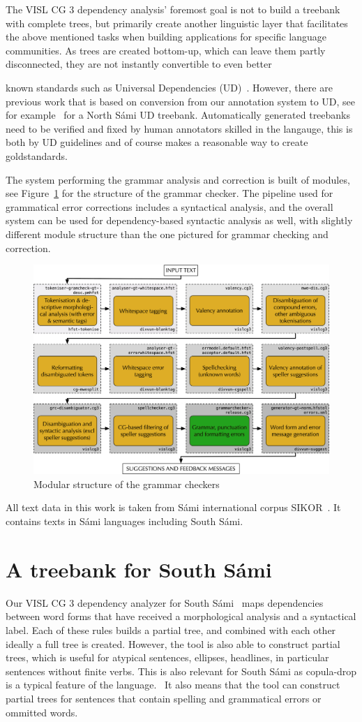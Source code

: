 \documentclass[free]{flammie}
\begin{document}
The VISL CG 3 dependency analysis' foremost goal is not to build a treebank with
complete trees, but primarily create another linguistic layer that facilitates
the above mentioned tasks when building applications for specific language
communities.  As trees are created bottom-up, which can leave them partly
disconnected, they are not instantly convertible to even better

known standards such as Universal Dependencies
(UD)~\cite{marneffe2021universal}.  However, there are previous work that is
based on conversion from our annotation system to UD, see for
example~\cite{sheyanova:2017,antonsen-etal-2010-reusing} for a North Sámi UD
treebank.  Automatically generated treebanks need to be verified and fixed by
human annotators skilled in the langauge, this is both by UD guidelines and of
course makes a reasonable way to create goldstandards.

The system performing the grammar analysis and correction is built of modules,
see Figure~\ref{fig:gramcheckflow} for the structure of the grammar checker.
The pipeline used for grammatical error corrections includes a syntactical
analysis, and the overall system can be used for dependency-based syntactic
analysis as well, with slightly different module structure than the one pictured
for grammar checking and correction.~\cite{wiechetek-kappfjell-2023-south}


\begin{figure}
    \centering
    \includegraphics[width=.4\textwidth ]{GramCheckFlow2.0.png}
    \caption{Modular structure of the grammar checkers\label{fig:gramcheckflow}}
\end{figure}

All text data in this work is taken from Sámi international corpus
SIKOR~\cite{sikor_06.11.2018}.  It contains texts in Sámi languages including
South Sámi.

\section{A treebank for South Sámi}


Our VISL CG 3 dependency analyzer for South
Sámi~\cite{wiechetek-kappfjell-2023-south} maps dependencies between word forms
that have received a morphological analysis and a syntactical label.  Each of
these rules builds a partial tree, and combined with each other ideally a full
tree is created. However, the tool is also able to construct partial trees,
which is useful for atypical sentences, ellipses, headlines, in particular
sentences without finite verbs. This is also relevant for South Sámi as
copula-drop is a typical feature of the language.~\cite{Magga2012} It also means
that the tool can construct partial trees for sentences that contain spelling
and grammatical errors or ommitted words.
\end{document}
